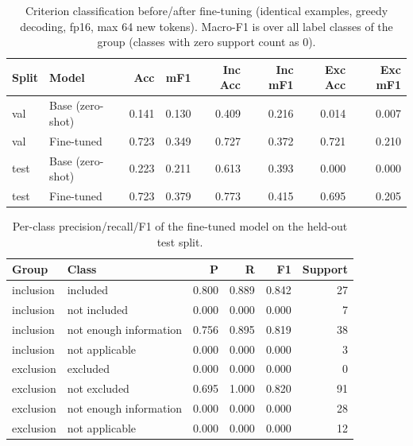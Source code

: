 \begin{table}[t]
\centering
\caption{Criterion classification before/after fine-tuning (identical examples, greedy decoding, fp16, max 64 new tokens). Macro-F1 is over all label classes of the group (classes with zero support count as 0).}
\label{tab:cls}
\footnotesize
\begin{tabular}{llrrrrrr}
\toprule
Split & Model & Acc & mF1 & Inc Acc & Inc mF1 & Exc Acc & Exc mF1 \\
\midrule
val & Base (zero-shot) & 0.141 & 0.130 & 0.409 & 0.216 & 0.014 & 0.007 \\
val & Fine-tuned & 0.723 & 0.349 & 0.727 & 0.372 & 0.721 & 0.210 \\
test & Base (zero-shot) & 0.223 & 0.211 & 0.613 & 0.393 & 0.000 & 0.000 \\
test & Fine-tuned & 0.723 & 0.379 & 0.773 & 0.415 & 0.695 & 0.205 \\
\bottomrule
\end{tabular}
\end{table}

\begin{table}[t]
\centering
\caption{Per-class precision/recall/F1 of the fine-tuned model on the held-out test split.}
\label{tab:perclass}
\footnotesize
\begin{tabular}{llrrrr}
\toprule
Group & Class & P & R & F1 & Support \\
\midrule
inclusion & included & 0.800 & 0.889 & 0.842 & 27 \\
inclusion & not included & 0.000 & 0.000 & 0.000 & 7 \\
inclusion & not enough information & 0.756 & 0.895 & 0.819 & 38 \\
inclusion & not applicable & 0.000 & 0.000 & 0.000 & 3 \\
exclusion & excluded & 0.000 & 0.000 & 0.000 & 0 \\
exclusion & not excluded & 0.695 & 1.000 & 0.820 & 91 \\
exclusion & not enough information & 0.000 & 0.000 & 0.000 & 28 \\
exclusion & not applicable & 0.000 & 0.000 & 0.000 & 12 \\
\bottomrule
\end{tabular}
\end{table}

